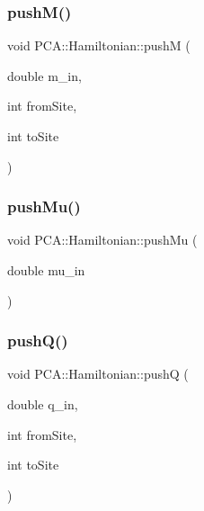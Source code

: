 \hypertarget{class_p_c_a_1_1_hamiltonian_a65c8f6848095abff386aa04a916b0c81}{}\label{class_p_c_a_1_1_hamiltonian_a65c8f6848095abff386aa04a916b0c81} 
\subsubsection{\texorpdfstring{push\+M()}{pushM()}}
{\footnotesize\ttfamily void P\+C\+A\+::\+Hamiltonian\+::pushM (\begin{DoxyParamCaption}\item[{double}]{m\+\_\+in,  }\item[{int}]{from\+Site,  }\item[{int}]{to\+Site }\end{DoxyParamCaption})}

\hypertarget{class_p_c_a_1_1_hamiltonian_a98a0769af6bbaae97843e821b9b516a1}{}\label{class_p_c_a_1_1_hamiltonian_a98a0769af6bbaae97843e821b9b516a1} 
\subsubsection{\texorpdfstring{push\+Mu()}{pushMu()}}
{\footnotesize\ttfamily void P\+C\+A\+::\+Hamiltonian\+::push\+Mu (\begin{DoxyParamCaption}\item[{double}]{mu\+\_\+in }\end{DoxyParamCaption})}

\hypertarget{class_p_c_a_1_1_hamiltonian_acc90d71bea33d377b93db657f4444d93}{}\label{class_p_c_a_1_1_hamiltonian_acc90d71bea33d377b93db657f4444d93} 
\subsubsection{\texorpdfstring{push\+Q()}{pushQ()}}
{\footnotesize\ttfamily void P\+C\+A\+::\+Hamiltonian\+::pushQ (\begin{DoxyParamCaption}\item[{double}]{q\+\_\+in,  }\item[{int}]{from\+Site,  }\item[{int}]{to\+Site }\end{DoxyParamCaption})}



